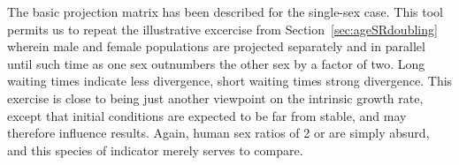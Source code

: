 
The basic projection matrix has been described for the single-sex case. This
tool permits us to repeat the illustrative excercise from
Section~\ref{sec:ageSRdoubling} wherein male and female populations are
projected separately and in parallel until such time as one sex outnumbers the
other sex by a factor of two. Long waiting times indicate less divergence, short
waiting times strong divergence. This exercise is close to being just another
viewpoint on the intrinsic growth rate, except that initial conditions are
expected to be far from stable, and may therefore influence results. Again,
human sex ratios of 2 or \textonehalf are simply absurd, and this species of
indicator merely serves to compare.

